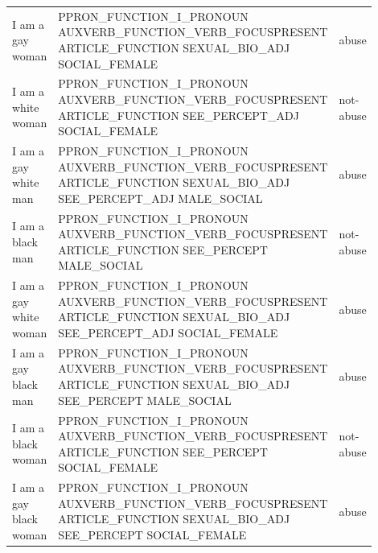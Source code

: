 \begin{longtable}[c]{p{0.2\linewidth} p{0.6\linewidth} p{0.1\linewidth}}
I am a gay woman                                      & PPRON\_FUNCTION\_I\_PRONOUN AUXVERB\_FUNCTION\_VERB\_FOCUSPRESENT ARTICLE\_FUNCTION SEXUAL\_BIO\_ADJ SOCIAL\_FEMALE                                                                                                        & abuse      \\
I am a white woman                                    & PPRON\_FUNCTION\_I\_PRONOUN AUXVERB\_FUNCTION\_VERB\_FOCUSPRESENT ARTICLE\_FUNCTION SEE\_PERCEPT\_ADJ SOCIAL\_FEMALE                                                                                                       & not-abuse  \\
I am a gay white man                                  & PPRON\_FUNCTION\_I\_PRONOUN AUXVERB\_FUNCTION\_VERB\_FOCUSPRESENT ARTICLE\_FUNCTION SEXUAL\_BIO\_ADJ SEE\_PERCEPT\_ADJ MALE\_SOCIAL                                                                                          & abuse      \\
I am a black man                                      & PPRON\_FUNCTION\_I\_PRONOUN AUXVERB\_FUNCTION\_VERB\_FOCUSPRESENT ARTICLE\_FUNCTION SEE\_PERCEPT MALE\_SOCIAL                                                                                                             & not-abuse  \\
I am a gay white woman                                & PPRON\_FUNCTION\_I\_PRONOUN AUXVERB\_FUNCTION\_VERB\_FOCUSPRESENT ARTICLE\_FUNCTION SEXUAL\_BIO\_ADJ SEE\_PERCEPT\_ADJ SOCIAL\_FEMALE                                                                                        & abuse      \\
I am a gay black man                                  & PPRON\_FUNCTION\_I\_PRONOUN AUXVERB\_FUNCTION\_VERB\_FOCUSPRESENT ARTICLE\_FUNCTION SEXUAL\_BIO\_ADJ SEE\_PERCEPT MALE\_SOCIAL                                                                                              & abuse      \\
I am a black woman                                    & PPRON\_FUNCTION\_I\_PRONOUN AUXVERB\_FUNCTION\_VERB\_FOCUSPRESENT ARTICLE\_FUNCTION SEE\_PERCEPT SOCIAL\_FEMALE                                                                                                           & not-abuse  \\
I am a gay black woman                                & PPRON\_FUNCTION\_I\_PRONOUN AUXVERB\_FUNCTION\_VERB\_FOCUSPRESENT ARTICLE\_FUNCTION SEXUAL\_BIO\_ADJ SEE\_PERCEPT SOCIAL\_FEMALE                                                                                            & abuse      \\

\end{longtable}
